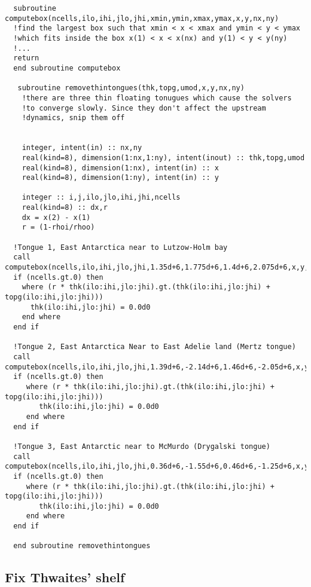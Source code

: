\documentclass{article}
\begin{document}
\begin{lstlisting}
  subroutine computebox(ncells,ilo,ihi,jlo,jhi,xmin,ymin,xmax,ymax,x,y,nx,ny)
  !find the largest box such that xmin < x < xmax and ymin < y < ymax
  !which fits inside the box x(1) < x < x(nx) and y(1) < y < y(ny)
  !...
  return
  end subroutine computebox
  
   subroutine removethintongues(thk,topg,umod,x,y,nx,ny)
    !there are three thin floating tonugues which cause the solvers
    !to converge slowly. Since they don't affect the upstream 
    !dynamics, snip them off

    
    integer, intent(in) :: nx,ny
    real(kind=8), dimension(1:nx,1:ny), intent(inout) :: thk,topg,umod
    real(kind=8), dimension(1:nx), intent(in) :: x
    real(kind=8), dimension(1:ny), intent(in) :: y

    integer :: i,j,ilo,jlo,ihi,jhi,ncells
    real(kind=8) :: dx,r
    dx = x(2) - x(1)
    r = (1-rhoi/rhoo)

  !Tongue 1, East Antarctica near to Lutzow-Holm bay
  call computebox(ncells,ilo,ihi,jlo,jhi,1.35d+6,1.775d+6,1.4d+6,2.075d+6,x,y,nx,ny)
  if (ncells.gt.0) then
    where (r * thk(ilo:ihi,jlo:jhi).gt.(thk(ilo:ihi,jlo:jhi) + topg(ilo:ihi,jlo:jhi))) 
      thk(ilo:ihi,jlo:jhi) = 0.0d0
    end where
  end if
  
  !Tongue 2, East Antarctica Near to East Adelie land (Mertz tongue)   
  call computebox(ncells,ilo,ihi,jlo,jhi,1.39d+6,-2.14d+6,1.46d+6,-2.05d+6,x,y,nx,ny)
  if (ncells.gt.0) then
     where (r * thk(ilo:ihi,jlo:jhi).gt.(thk(ilo:ihi,jlo:jhi) + topg(ilo:ihi,jlo:jhi))) 
        thk(ilo:ihi,jlo:jhi) = 0.0d0
     end where
  end if

  !Tongue 3, East Antarctic near to McMurdo (Drygalski tongue)
  call computebox(ncells,ilo,ihi,jlo,jhi,0.36d+6,-1.55d+6,0.46d+6,-1.25d+6,x,y,nx,ny)
  if (ncells.gt.0) then
     where (r * thk(ilo:ihi,jlo:jhi).gt.(thk(ilo:ihi,jlo:jhi) + topg(ilo:ihi,jlo:jhi))) 
        thk(ilo:ihi,jlo:jhi) = 0.0d0
     end where
  end if

  end subroutine removethintongues

\end{lstlisting}


\subsection{\label{sec::fts} Fix Thwaites' shelf}
\end{document}
